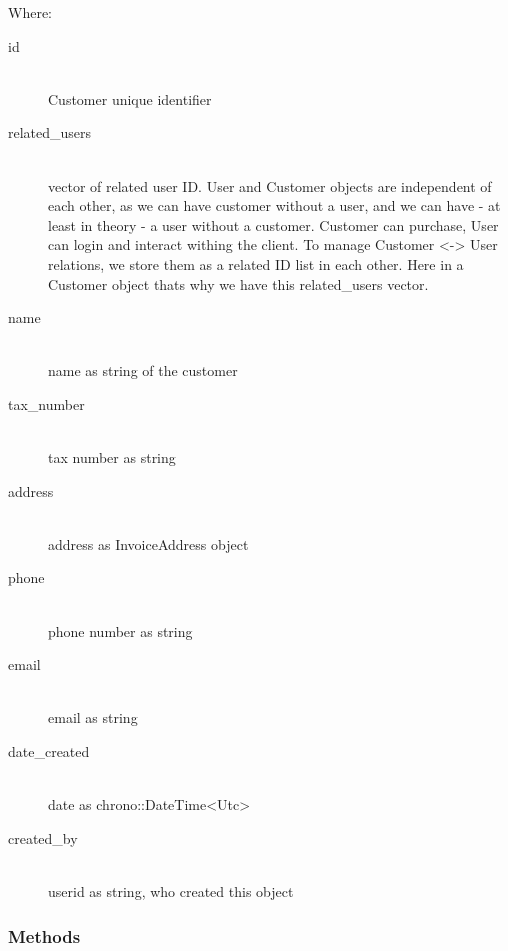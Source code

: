 \documentclass{article}
\begin{document}
Where:

\begin{description}
  \item[id] \hfill
    \\ Customer unique identifier 
  \item[related\_users] \hfill
    \\ vector of related user ID. User and Customer objects are independent
    of each other, as we can have customer without a user, and we can have
    - at least in theory - a user without a customer. Customer can
    purchase, User can login and interact withing the client. To manage
    Customer <-> User relations, we store them as a related ID list in
    each other. Here in a Customer object thats why we have this
    related\_users vector.

  \item[name] \hfill
    \\ name as string of the customer

  \item[tax\_number] \hfill
    \\ tax number as string
  \item[address] \hfill
    \\ address as InvoiceAddress object 
  \item[phone] \hfill
    \\ phone number as string
  \item[email] \hfill
    \\ email as string
  \item[date\_created] \hfill
    \\ date as chrono::DateTime<Utc>
  \item[created\_by] \hfill
    \\ userid as string, who created this object 
\end{description}

\subsubsection{Methods}
\end{document}
